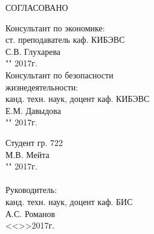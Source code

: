 СОГЛАСОВАНО
\vspace{0.01cm}
\begin{singlespace}
 \begin{minipage}[left]{0.40\linewidth}
 Консультант по экономике:\\
 ст. преподаватель каф. КИБЭВС \\
 \underline{\hspace{2.5cm}}С.В. Глухарева \\
 "\underline{\hspace{1cm}}"\underline{\hspace{3cm}} 2017г.\\

 Консультант по безопасности\\ жизнедеятельности:\\
 канд. техн. наук, доцент каф. КИБЭВС\\
 \underline{\hspace{2.5cm}}Е.М. Давыдова\\
 "\underline{\hspace{1cm}}"\underline{\hspace{3cm}} 2017г.\\
 \end{minipage}
 \hfill
 \begin{minipage}[left]{0.5\linewidth}
  \vspace{0.7cm}
  Студент гр. 722 \\
  \underline{\hspace{3cm}}М.В. Мейта  \\
 "\underline{\hspace{1cm}}"\underline{\hspace{3cm}} 2017г.\\
 \vspace{0.3cm}\\ 
  Руководитель: \\
  канд. техн. наук, доцент каф. БИС \\
  \underline{\hspace{3cm}} А.С. Романов \\
  <<\underline{\hspace{1cm}}>>\underline{\hspace{3cm}}2017г.\\
 \end{minipage}
\end{singlespace}



